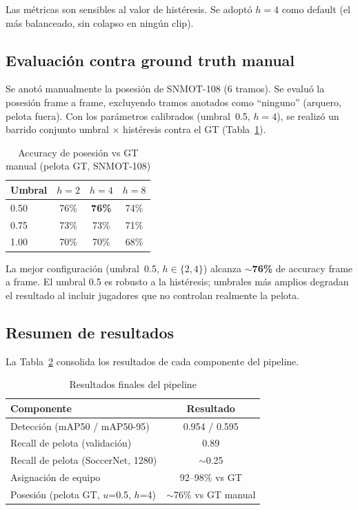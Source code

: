 \documentclass[conference]{IEEEtran}
\begin{document}
Las métricas son sensibles al valor de histéresis. Se adoptó $h=4$ como
default (el más balanceado, sin colapso en ningún clip).

\subsection{Evaluación contra ground truth manual}

Se anotó manualmente la posesión de SNMOT-108 (6 tramos). Se evaluó la
posesión frame a frame, excluyendo tramos anotados como ``ninguno''
(arquero, pelota fuera). Con los parámetros calibrados (umbral~0.5,
$h=4$), se realizó un barrido conjunto umbral $\times$ histéresis
contra el GT (Tabla~\ref{tab:calibracion}).

\begin{table}[htbp]
\caption{Accuracy de posesión vs GT manual (pelota GT, SNMOT-108)}
\begin{center}
\begin{tabular}{lccc}
\toprule
\textbf{Umbral} & $h=2$ & $h=4$ & $h=8$ \\
\midrule
0.50 & 76\% & \textbf{76\%} & 74\% \\
0.75 & 73\% & 73\% & 71\% \\
1.00 & 70\% & 70\% & 68\% \\
\bottomrule
\end{tabular}
\label{tab:calibracion}
\end{center}
\end{table}

La mejor configuración (umbral~0.5, $h \in \{2, 4\}$) alcanza
\textbf{$\sim$76\%} de accuracy frame a frame. El umbral 0.5 es robusto
a la histéresis; umbrales más amplios degradan el resultado al incluir
jugadores que no controlan realmente la pelota.

\subsection{Resumen de resultados}

La Tabla~\ref{tab:resultados_finales} consolida los resultados de cada
componente del pipeline.

\begin{table}[htbp]
\caption{Resultados finales del pipeline}
\begin{center}
\begin{tabular}{lc}
\toprule
\textbf{Componente} & \textbf{Resultado} \\
\midrule
Detección (mAP50 / mAP50-95) & 0.954 / 0.595 \\
Recall de pelota (validación) & 0.89 \\
Recall de pelota (SoccerNet, 1280) & $\sim$0.25 \\
Asignación de equipo & 92--98\% vs GT \\
Posesión (pelota GT, $u$=0.5, $h$=4) & $\sim$76\% vs GT manual \\
\bottomrule
\end{tabular}
\label{tab:resultados_finales}
\end{center}
\end{table}
\end{document}

